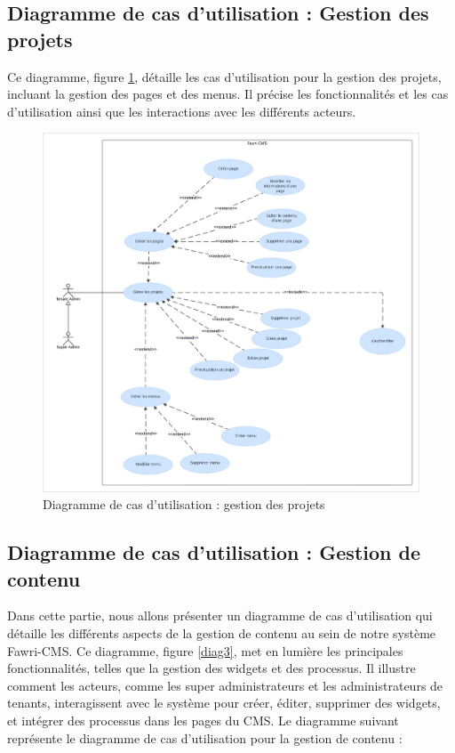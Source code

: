 \subsection{Diagramme de cas d'utilisation : Gestion des projets}

\hspace{\parindent}Ce diagramme, figure \ref*{diag2}, détaille les cas d'utilisation pour la gestion des projets, incluant la gestion des pages et des menus. Il précise les fonctionnalités et les cas d'utilisation ainsi que les interactions avec les différents acteurs.



\begin{figure}[H]
  \centering
  \includegraphics[width=17cm]{Figures/use case gestion des projets.png}
  \caption{Diagramme de cas d'utilisation : gestion des projets}
  \label{diag2} %
\end{figure}



\subsection{Diagramme de cas d’utilisation : Gestion de contenu}
\hspace{\parindent}Dans cette partie, nous allons présenter un diagramme de cas d'utilisation qui détaille les différents aspects de la gestion de contenu au sein de notre système Fawri-CMS. Ce diagramme, figure \ref*{diag3}, met en lumière les principales fonctionnalités, telles que la gestion des widgets et des processus. Il illustre comment les acteurs, comme les super administrateurs et les administrateurs de tenants, interagissent avec le système pour créer, éditer, supprimer des widgets, et intégrer des processus dans les pages du CMS. Le diagramme suivant représente le diagramme de cas d'utilisation pour la gestion de contenu :


